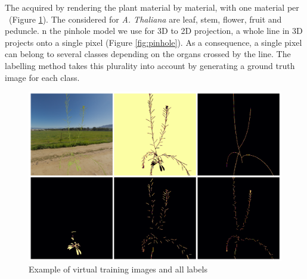 The  acquired by rendering the plant material by material, with one material per
~(Figure \ref{fig:plants}). The
 considered for \emph{A. Thaliana} are leaf, stem, flower,
fruit and peduncle. n the pinhole model \cite{sturm_pinhole_2014} we use for 3D to 2D
projection, a whole line in 3D projects onto a single pixel (Figure
\ref{fig:pinhole}). As a consequence, a single pixel can belong to
several classes depending on the organs crossed by the line. The
labelling method takes this plurality into account by generating a
ground truth image for each class.

\begin{figure}[h]
    \centering \includegraphics[width = 0.9\linewidth]{figures/Images_and_labels.png}
    \caption{Example of virtual training images and all labels}
    \label{fig:plants}
\end{figure}




